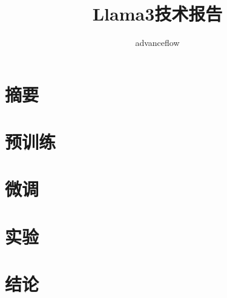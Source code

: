 \documentclass[lang=cn,a4paper]{paper}
\title{Llama3技术报告}
\author{advanceflow}
\begin{document}
\maketitle

\begin{abstract}

\end{abstract}

\section{摘要}

\section{预训练}
\section{微调}
\section{实验}
\section{结论}


\printbibliography

\end{document}
